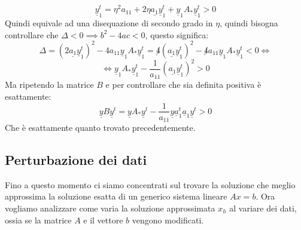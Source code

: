 \begin{itemize}
\begin{equation*}
              \underline{y}_1^t = \eta^2 a_{11}+2\eta\underline{a_1}\underline{y}_1^t +
              \underline{y}_1 A_\ast \underline{y}_1^t>0
          \end{equation*}
          Quindi equivale ad una disequazione di secondo grado in $\eta$, quindi
          bisogna controllare che $\Delta < 0\implies b^2-4ac<0$, questo significa:
          \begin{equation*}
              \Delta =(2\underline{a_1}\underline{y}_1^t)^2 -4a_{11}
              \underline{y}_1 A_\ast \underline{y}_1^t = \not 4(\underline{a_1}
              \underline{y}_1^t)^2 -\not 4 a_{11} \underline{y}_1 A_\ast \underline{y}_1^t
              < 0\iff
          \end{equation*}
          \begin{equation*}
              \iff \underline{y}_1 A_\ast \underline{y}_1^t - \frac{1}{a_{11}}
              (\underline{a_1}\underline{y}_1^t)^2>0
          \end{equation*}
          Ma ripetendo la matrice $B$ e per controllare che sia definita positiva
          è esattamente:
          \begin{equation*}
              \underline{y}B\underline{y}^t=\underline{y}A_\ast\underline{y}^t -
              \frac{1}{a_{11}} \underline{y}\underline{a}_1^t \underline{a}_1\underline{y}^t >0
          \end{equation*}
          Che è esattamente quanto trovato precedentemente.
\end{itemize}
\subsection{Perturbazione dei dati}
Fino a questo momento ci siamo concentrati sul trovare la soluzione che meglio
approssima la soluzione esatta di un generico sistema lineare $Ax=b$. Ora vogliamo
analizzare come varia la soluzione approssimata $x_h$ al variare dei dati, ossia
se la matrice $A$ e il vettore $b$ vengono modificati.

